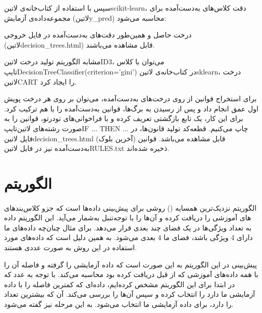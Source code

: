 \documentclass[a4paper,12pt]{article}
\begin{document}
سپس با استفاده از کتاب‌خانه‌ی ‌لاتین{scikit-learn}، دقت کلاس‌های به‌دست‌آمده برای مجموعه‌داده‌ی آزمایش (‌لاتین{y\_pred}) محاسبه می‌شود:
\begin{flushleft}
\end{flushleft}

درخت حاصل و همین‌طور دقت‌های به‌دست‌آمده در فایل خروجی (‌لاتین{decision\_trees.html}) قابل مشاهده می‌باشند.
	
	
	مشابه الگوریتم تولید درخت ‌لاتین{ID3}، می‌توان با کلاس ‌تایپ{DecisionTreeClassifier(criterion='gini')} در کتاب‌خانه‌ی ‌لاتین{sklearn}، درخت‌ ‌لاتین{CART} را ایجاد کرد.
	
	
	
	برای استخراج قوانین از روی درخت‌های به‌دست‌آمده، می‌توان بر روی هر درخت پویش اول عمق انجام داد و پس از رسیدن به برگ‌ها، قوانین به‌دست‌آمده را با هم ترکیب کرد. برای این کار، یک تابع بازگشتی تعریف کرده و با فراخوانی‌های تودرتو، قوانین را به صورت رشته‌های ‌لاتین{‌تایپ{IF ... THEN ...}} چاپ می‌کنیم. قطعه‌کد تولید قانون‌ها، در فایل ‌لاتین{decision\_trees.html} (آخرین بلوک) قابل مشاهده می‌باشد. قوانین به‌دست‌آمده نیز در فایل ‌لاتین{RULES.txt} ذخیره شده‌اند.
	
\section{الگوریتم }
\paragraph{}
الگوریتم  نزدیک‌ترین همسایه () روشی برای پیش‌بینی  داده‌ها است که جزو کلاس‌بندهای تنبل به‌شمار می‌آید. این الگوریتم داده‌‎های آموزشی را دریافت کرده و آن‌ها را با توجه به تعداد ویژگی‌ها در یک فضای چند بعدی قرار می‌دهد. برای مثال چنان‌چه داد‌ه‌های ما دارای 4 ویژگی باشد، فضای ما 4 بعدی می‌شود. به همین دلیل است که داده‌های مورد استفاده در این روش به صورت عددی هستند.

پیش‌بینی در این الگوریتم به این صورت است که داده آزمایشی را گرفته و فاصله آن را با همه داده‌های آموزشی که از قبل دریافت کرده بود محاسبه می‌کند. با توجه به عدد  که در ابتدا برای این الگوریتم مشخص کرده‌ایم،  داده‌ای که کمترین فاصله را با داده آزمایشی ما دارد را انتخاب کرده و سپس  آن‌ها را بررسی می‌کند. آن  که بیشترین تعداد را دارد، برای  داده آزمایشی ما انتخاب می‌شود. به این مرحله  نیز گفته می‌شود.
\end{document}
